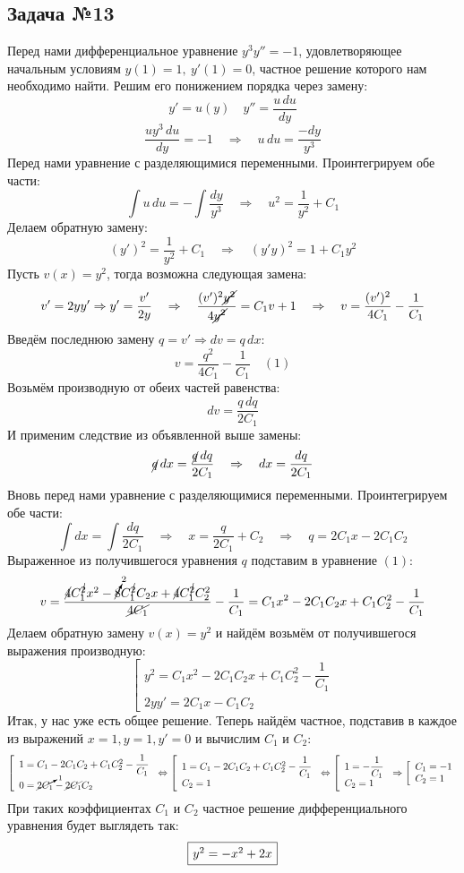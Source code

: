 \documentclass[a3paper,14pt]{extarticle}
\newcommand*\squared[1]{\tikz[baseline=(char.base)]{
            \node[shape=rectangle,draw,inner sep=4pt] (char) {#1};}}
\begin{document}
\subsection*{\centering Задача №13}
Перед нами дифференциальное уравнение $y^3y''=-1$, удовлетворяющее начальным условиям $y(1) = 1,\ y'(1) = 0$, частное решение которого нам необходимо найти. Решим его понижением порядка через замену:
$$y' = u(y)\quad y'' = \frac{u\,du}{dy}$$
$$\frac{uy^3\,du}{dy} = -1\quad \Rightarrow \quad u\,du = \frac{-dy}{y^3}$$
Перед нами уравнение с разделяющимися переменными. Проинтегрируем обе части:
$$\int u\,du = -\int\frac{dy}{y^3}\quad \Rightarrow \quad u^2 = \frac{1}{y^2}+C_1$$
Делаем обратную замену:
$$(y')^2 = \frac{1}{y^2} + C_1\quad \Rightarrow \quad (y'y)^2 = 1 + C_1y^2$$
Пусть $v(x) = y^2$, тогда возможна следующая замена:
$$v' = 2yy' \Rightarrow y' = \frac{v'}{2y}\quad \Rightarrow \quad \frac{(v')^2\cancel{y^2}}{4\cancel{y^2}} = C_1v + 1\quad \Rightarrow \quad v = \frac{(v')^2}{4C_1} - \frac{1}{C_1}$$
Введём последнюю замену $q = v' \Rightarrow dv = q\,dx$:
$$v = \frac{q^2}{4C_1}-\frac{1}{C_1}\quad(1)$$
Возьмём производную от обеих частей равенства:
$$dv = \frac{q\,dq}{2C_1}$$
И применим следствие из объявленной выше замены:
$$\cancel{q}\,dx = \frac{\cancel{q}\,dq}{2C_1}\quad \Rightarrow \quad dx = \frac{dq}{2C_1}$$
Вновь перед нами уравнение с разделяющимися переменными. Проинтегрируем обе части:
$$\int dx = \int\frac{dq}{2C_1} \quad \Rightarrow \quad x = \frac{q}{2C_1} + C_2 \quad \Rightarrow \quad q = 2C_1x - 2C_1C_2$$
Выраженное из получившегося уравнения $q$ подставим в уравнение $(1)$:
$$v = \frac{\cancel{4}C_1^{\cancel{2}}x^2 - \cancelto{2}{8}C_1^{\cancel{2}}C_2x + \cancel{4}C_1^{\cancel{2}}C_2^2}{\cancel{4C_1}}-\frac{1}{C_1} = C_1x^2 - 2C_1C_2x + C_1C_2^2-\frac{1}{C_1}$$
Делаем обратную замену $v(x) = y^2$ и найдём возьмём от получившегося выражения производную:
$$\left[\begin{array}{l}
    y^2 = C_1x^2 - 2C_1C_2x + C_1C_2^2-\dfrac{1}{C_1} \\
    2yy' = 2C_1x - C_1C_2
\end{array}\right.$$
Итак, у нас уже есть общее решение. Теперь найдём частное, подставив в каждое из выражений $x = 1, y = 1, y' = 0$ и вычислим $C_1$ и $C_2$:
$$\left[\begin{array}{l}
    1 = C_1 - 2C_1C_2 + C_1C_2^2 - \dfrac{1}{C_1} \\
    0 = \cancelto{1}{2C_1} - \cancel{2C_1}C_2 
\end{array}\right. \Leftrightarrow \left[\begin{array}{l}
    1 = C_1 - 2C_1C_2 + C_1C_2^2 - \dfrac{1}{C_1} \\
    C_2 = 1
\end{array}\right. \Leftrightarrow \left[\begin{array}{l}
    1 = - \dfrac{1}{C_1} \\
    C_2 = 1
\end{array}\right. \Rightarrow \left[\begin{array}{l}
    C_1 = -1 \\
    C_2 = 1
\end{array}\right.$$
При таких коэффициентах $C_1$ и $C_2$ частное решение дифференциального уравнения будет выглядеть так:
$$\squared{$y^2 = -x^2 + 2x$}$$
\end{document}
